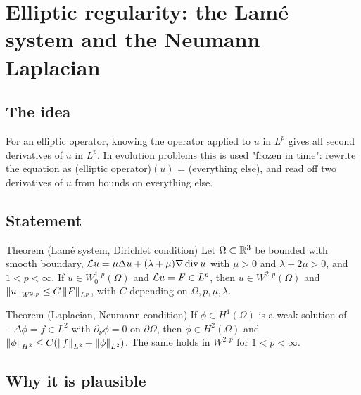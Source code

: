 
\section{Elliptic regularity: the Lamé system and the Neumann Laplacian}\label{p:elliptic-regularity}


\subsection*{The idea}

For an elliptic operator, knowing the operator applied to $u$ in $L^p$ gives all second derivatives of $u$ in $L^p$. In evolution problems this is used "frozen in time": rewrite the equation as (elliptic operator)$(u)$ = (everything else), and read off two derivatives of $u$ from bounds on everything else.

\subsection*{Statement}

\begin{thmbox}{Theorem (Lamé system, Dirichlet condition)}
%
Let $\Omega\subset\mathbb{R}^3$ be bounded with smooth boundary, $\mathcal{L} u = \mu\Delta u+(\lambda+\mu)\nabla\operatorname{div} u$ with $\mu> 0$ and $\lambda+2\mu> 0$, and $1< p< \infty$. If $u\in W^{1,p}_0(\Omega)$ and $\mathcal{L} u = F\in L^p$, then $u\in W^{2,p}(\Omega)$ and $\left\lVert u\right\rVert_{W^{2,p}}\le C\left\lVert F\right\rVert_{L^p}$, with $C$ depending on $\Omega, p, \mu, \lambda$.
\end{thmbox}

\begin{thmbox}{Theorem (Laplacian, Neumann condition)}
%
If $\phi\in H^1(\Omega)$ is a weak solution of $-\Delta\phi = f\in L^2$ with $\partial_\nu\phi = 0$ on $\partial\Omega$, then $\phi\in H^2(\Omega)$ and $\left\lVert \phi\right\rVert_{H^2}\le C(\left\lVert f\right\rVert_{L^2}+\left\lVert \phi\right\rVert_{L^2})$. The same holds in $W^{2,p}$ for $1< p< \infty$.
\end{thmbox}

\subsection*{Why it is plausible}

